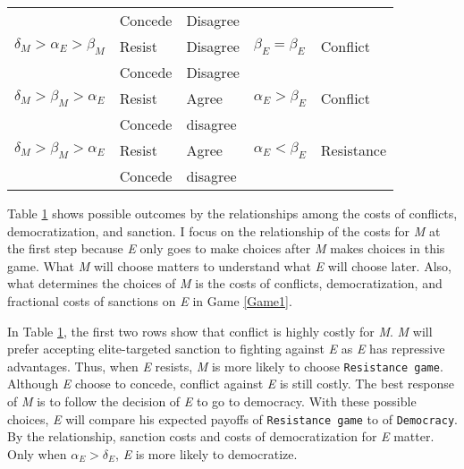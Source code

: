 \documentclass[11pt]{article}
\begin{document}
\begin{table}[!ht]
\begin{tabular}{ p{3cm} p{2cm} p{2cm} p{3cm} p{3cm} }
	     	                                  & Concede  & Disagree &                           &                \\
		$\delta_{M} > \alpha_{E} > \beta_{M}$ & Resist   & Disagree & $\beta_{E} = \beta_{E}$   & Conflict \\
	                                        & Concede  & Disagree &                           &                \\
		$\delta_{M} > \beta_{M} > \alpha_{E}$	& Resist   & Agree    & $\alpha_{E} > \beta_{E}$  & Conflict         \\
		                                      & Concede  & disagree &                           &                \\
    $\delta_{M} > \beta_{M} > \alpha_{E}$	& Resist   & Agree    & $\alpha_{E} < \beta_{E}$  & Resistance     \\
		                                      & Concede  & disagree &                           &                \\
		\bottomrule
	\end{tabular}
	{\raggedright }
	\label{tab:table1}
\end{table}

Table \ref{tab:table1} shows possible outcomes by the relationships among the costs of conflicts, democratization, and sanction. I focus on the relationship of the costs for \textit{M} at the first step because \textit{E} only goes to make choices after \textit{M} makes choices in this game. What \textit{M} will choose matters to understand what \textit{E} will choose later. Also, what determines the choices of \textit{M} is the costs of conflicts, democratization, and fractional costs of sanctions on \textit{E} in Game \ref{Game1}.

In Table \ref{tab:table1}, the first two rows show that conflict is highly costly for \textit{M}. \textit{M} will prefer accepting elite-targeted sanction to fighting against \textit{E} as \textit{E} has repressive advantages. Thus, when \textit{E} resists, \textit{M} is more likely to choose \texttt{Resistance game}. Although \textit{E} choose to concede, conflict against \textit{E} is still costly. The best response of \textit{M} is to follow the decision of \textit{E} to go to democracy. With these possible choices, \textit{E} will compare his expected payoffs of \texttt{Resistance game} to of \texttt{Democracy}. By the relationship, sanction costs and costs of democratization for \textit{E} matter. Only when $\alpha_{E} > \delta_{E}$, \textit{E} is more likely to democratize.
\end{document}
